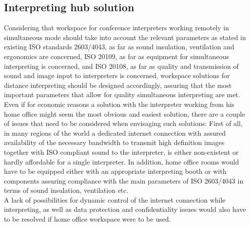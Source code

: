 \documentclass[output=paper]{langsci/langscibook}
\begin{document}
\subsection{Interpreting hub solution}

Considering that workspace for conference interpreters working remotely in simultaneous mode should take into account the relevant parameters as stated in existing ISO standards 2603/4043, as far as sound insulation, ventilation and ergonomics are concerned, ISO 20109, as far as equipment for simultaneous interpreting is concerned, and ISO 20108, as far as quality and transmission of sound and image input to interpreters is concerned, workspace solutions for distance interpreting should be designed accordingly, assuring that the most important parameters that allow for quality simultaneous interpreting are met.\\
Even if for economic reasons a solution with the interpreter working from his home office might seem the most obvious and easiest solution, there are a couple of issues that need to be considered when envisaging such solutions: First of all, in many regions of the world a dedicated internet connection with assured availability of the necessary bandwidth to transmit high definition images together with ISO compliant sound to the interpreter, is either non-existent or hardly affordable for a single interpreter. In addition, home office rooms would have to be equipped either with an appropriate interpreting booth or with components assuring compliance with the main parameters of ISO 2603/4043 in terms of sound insulation, ventilation etc. \\
A lack of possibilities for dynamic control of the internet connection while interpreting, as well as data protection and confidentiality issues would also have to be resolved if home office workspace were to be used.
\end{document}
